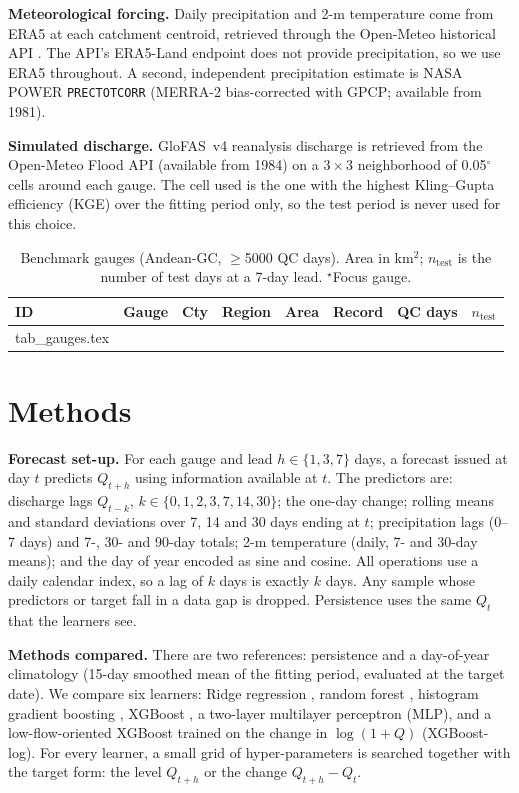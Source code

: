 \documentclass[graybox]{svmult}
\makeatletter
\newcommand{\inputtable}[1]{\@@input #1 }
\makeatother
\begin{document}
\textbf{Meteorological forcing.} Daily precipitation and 2-m temperature come from ERA5 \cite{hersbach2020era5} at each catchment centroid, retrieved through the Open-Meteo historical API \cite{openmeteo}. The API's ERA5-Land endpoint \cite{munozsabater2021era5land} does not provide precipitation, so we use ERA5 throughout. A second, independent precipitation estimate is NASA POWER \texttt{PRECTOTCORR} (MERRA-2 bias-corrected with GPCP; available from 1981).

\textbf{Simulated discharge.} GloFAS~v4 reanalysis discharge is retrieved from the Open-Meteo Flood API (available from 1984) on a $3\times3$ neighborhood of 0.05$^\circ$ cells around each gauge. The cell used is the one with the highest Kling--Gupta efficiency (KGE) over the fitting period only, so the test period is never used for this choice.

\begin{table}[!htb]
\centering
\caption{Benchmark gauges (Andean-GC, $\ge$5000 QC days). Area in km$^2$; $n_{\mathrm{test}}$ is the number of test days at a 7-day lead. $^\star$Focus gauge.}
\label{tab:gauges}
\scriptsize
\setlength{\tabcolsep}{3pt}
\begin{tabular}{llllrlrr}
\toprule
ID & Gauge & Cty & Region & Area & Record & QC days & $n_{\mathrm{test}}$ \\
\midrule
\inputtable{tab_gauges.tex}
\bottomrule
\end{tabular}
\end{table}

\section{Methods}
\label{sec:methods}

\textbf{Forecast set-up.} For each gauge and lead $h\in\{1,3,7\}$ days, a forecast issued at day $t$ predicts $Q_{t+h}$ using information available at $t$. The \nFeatures{} predictors are: discharge lags $Q_{t-k}$, $k\in\{0,1,2,3,7,14,30\}$; the one-day change; rolling means and standard deviations over 7, 14 and 30 days ending at $t$; precipitation lags (0--7 days) and 7-, 30- and 90-day totals; 2-m temperature (daily, 7- and 30-day means); and the day of year encoded as sine and cosine. All operations use a daily calendar index, so a lag of $k$ days is exactly $k$ days. Any sample whose predictors or target fall in a data gap is dropped. Persistence uses the same $Q_t$ that the learners see.

\textbf{Methods compared.} There are two references: persistence and a day-of-year climatology (15-day smoothed mean of the fitting period, evaluated at the target date). We compare six learners: Ridge regression \cite{hoerl1970ridge}, random forest \cite{breiman2001rf}, histogram gradient boosting \cite{friedman2001gbm}, XGBoost \cite{chen2016xgboost}, a two-layer multilayer perceptron (MLP), and a low-flow-oriented XGBoost trained on the change in $\log(1+Q)$ (XGBoost-log). For every learner, a small grid of hyper-parameters is searched together with the target form: the level $Q_{t+h}$ or the change $Q_{t+h}-Q_t$.
\end{document}
